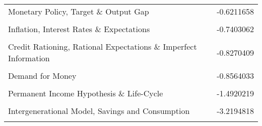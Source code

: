 \documentclass[]{elsarticle} %
\begin{document}
\begin{table}[!h]
\begin{tabular}[t]{lr}
Monetary Policy, Target \& Output Gap & -0.6211658\\
\cellcolor{gray!6}{REH, Monetary Policy \& Business Cycles} & \cellcolor{gray!6}{-0.6758668}\\
Inflation, Interest Rates \& Expectations & -0.7403062\\
\cellcolor{gray!6}{Monetary Approach of Balance of Payments} & \cellcolor{gray!6}{-0.7658536}\\
\addlinespace
Credit Rationing, Rational Expectations \& Imperfect Information & -0.8270409\\
\cellcolor{gray!6}{Inflation \& Rigidities} & \cellcolor{gray!6}{-0.8396888}\\
Demand for Money & -0.8564033\\
\cellcolor{gray!6}{New Theory of Money: Search, Bargaining...} & \cellcolor{gray!6}{-1.2139877}\\
Permanent Income Hypothesis \& Life-Cycle & -1.4920219\\
\addlinespace
\cellcolor{gray!6}{Monetary Economics \& Demand for Money} & \cellcolor{gray!6}{-1.6768415}\\
Intergenerational Model, Savings and Consumption & -3.2194818\\
\cellcolor{gray!6}{Marginal Taxation} & \cellcolor{gray!6}{-3.3179236}\\
\bottomrule
\end{tabular}
\end{table}

\newpage

\begingroup\fontsize{9}{11}\selectfont
\end{document}
